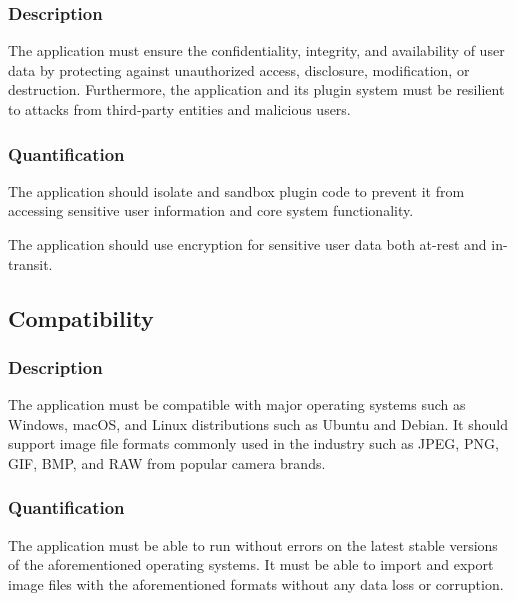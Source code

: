 \documentclass[11pt,a4paper]{article}
\begin{document}
\subsubsection*{Description}
The application must ensure the confidentiality, integrity, and availability of
user data by protecting against unauthorized access, disclosure, modification,
or destruction. Furthermore, the application and its plugin system must be
resilient to attacks from third-party entities and malicious users.

\subsubsection*{Quantification}
The application should isolate and sandbox plugin code to prevent it from
accessing sensitive user information and core system functionality.

The application should use encryption for sensitive user data both at-rest and
in-transit. 

\subsection{Compatibility} 

\subsubsection*{Description}
The application must be compatible with major operating systems such as Windows,
macOS, and Linux distributions such as Ubuntu and Debian. It should support
image file formats commonly used in the industry such as JPEG, PNG, GIF, BMP,
and RAW from popular camera brands.

\subsubsection*{Quantification}
The application must be able to run without errors on the latest stable versions
of the aforementioned operating systems. It must be able to import and export
image files with the aforementioned formats without any data loss or corruption. 



\end{document}
